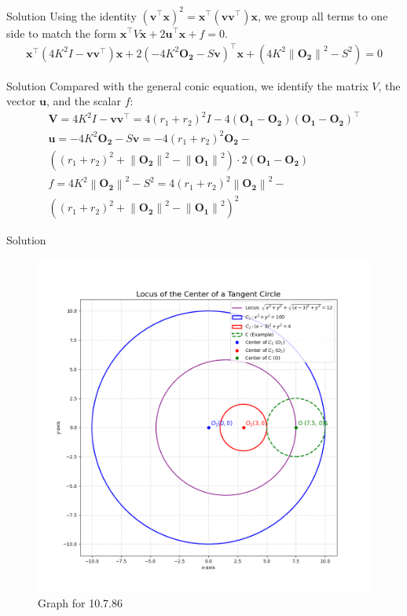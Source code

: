 \documentclass{beamer}
\let\vec\mathbf
\providecommand{\brak}[1]{\ensuremath{\left(#1\right)}}
\theoremstyle{remark}
\providecommand{\norm}[1]{\left\lVert#1\right\rVert}
\begin{document}
\begin{frame}{Solution}
Using the identity $\brak{\vec{v}^{\top}\vec{x}}^2 = \vec{x}^{\top}\brak{\vec{v}\vec{v}^{\top}}\vec{x}$, we group all terms to one side to match the form $\vec{x}^{\top}V\vec{x} + 2\vec{u}^{\top}\vec{x} + f = 0$.
\begin{align}
 \vec{x}^{\top}\brak{4K^2I - \vec{v}\vec{v}^{\top}}\vec{x} + 2\brak{-4K^2\vec{O_2} - S\vec{v}}^{\top}\vec{x} + \brak{4K^2\norm{\vec{O_2}}^2 - S^2}= 0
\end{align}

\end{frame}
\begin{frame}{Solution}
    Compared with the general conic equation, we identify the matrix $V$, the vector $\vec{u}$, and the scalar $f$:
\begin{align}
    \vec{V} = 4K^2I - \vec{v}\vec{v}^{\top} = 4\brak{r_1 + r_2}^2I - 4\brak{\vec{O_1}-\vec{O_2}}\brak{\vec{O_1}-\vec{O_2}}^{\top} \\
    \vec{u} = -4K^2\vec{O_2} - S\vec{v} = -4\brak{r_1 + r_2}^2\vec{O_2} - \nonumber\\ \brak{\brak{r_1 + r_2}^2 + \norm{\vec{O_2}}^2 - \norm{\vec{O_1}}^2 }\cdot 2\brak{\vec{O_1}-\vec{O_2}} \\
    f = 4K^2\norm{\vec{O_2}}^2 - S^2 = 4\brak{r_1 + r_2}^2\norm{\vec{O_2}}^2 - \nonumber\\ \brak{\brak{r_1 + r_2}^2 + \norm{\vec{O_2}}^2 - \norm{\vec{O_1}}^2}^2
\end{align}
\end{frame}
\begin{frame}{Solution}
    \begin{figure}[H]
        \centering
        \includegraphics[width=0.5\columnwidth]{figs/1.png}
        \caption{Graph for 10.7.86}
        \label{fig:placeholder}
    \end{figure}
\end{frame}
\end{document}
